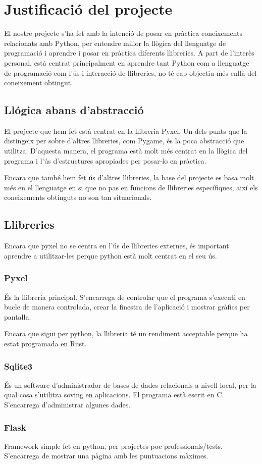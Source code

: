 \section{Justificaci\'o del projecte}
El nostre projecte s'ha fet amb la intenci\'o de
posar en pr\`actica coneixements relacionats amb Python,
per entendre millor la ll\`ogica del llenguatge de programaci\'o
i aprendre i posar en pr\`actica diferents llibreries.
A part de l'inter\`es personal,
est\`a centrat principalment en aprendre tant
Python com a llenguatge de programaci\'o com l'\'us i interacci\'o de llibreries,
no t\'e cap objectiu m\'es enll\`a del coneixement obtingut.


\subsection{Ll\'ogica abans d'abstracci\'o}
El projecte que hem fet est\`a centrat en la llibreria Pyxel.
Un dels punts que la distingeix per sobre d'altres llibreries, com Pygame,
\'es la poca abstracci\'o que utilitza.
D'aquesta manera, el programa est\`a molt m\'es centrat en la ll\`ogica
del programa i l'\'us d'estructures apropiades per posar-lo en pr\`actica.

Encara que tamb\'e hem fet \'us d'altres llibreries,
la base del projecte es basa molt m\'es en el llenguatge en si que
no pas en funcions de llibreries espec\'ifiques,
aix\'i els coneixements obtinguts no son tan situacionals.


\subsection{Llibreries}
Encara que pyxel no se centra en l'\'us de llibreries externes,
\'es important aprendre a utilitzar-les
perque python est\`a molt centrat en el seu \'us.

\subsubsection{Pyxel}
\'Es la llibreria principal.
S'encarrega de controlar que el programa s'executi en bucle de manera controlada,
crear la finestra de l'aplicaci\'o i mostrar gr\`afics per pantalla.

Encara que sigui per python, la llibreria t\'e un rendiment acceptable
perque ha estat programada en Rust.

\subsubsection{Sqlite3}
\'Es un software d'administrador de bases de dades relacionals a nivell local,
per la qual cosa s'utilitza soving en aplicacions. El programa est\`a escrit en C.
S'encarrega d'administrar algunes dades.

\subsubsection{Flask}
Framework simple fet en python, per projectes poc professionals/tests.
S'encarrega de mostrar una p\`agina amb les puntuacions m\`aximes.





